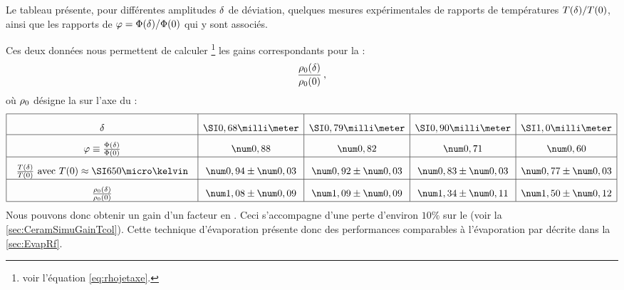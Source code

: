 \noindent Le tableau  présente, pour différentes amplitudes ${\delta}$ de déviation, quelques mesures expérimentales de rapports de températures 
$
{{T({\delta})} / {T(0)}}
$,
ainsi que les rapports de \fats
$
{\varphi}={{{\Phi}({\delta})} / {{\Phi}(0)}}
$
qui y sont associés. 

\noindent Ces deux données nous permettent de calculer%
\footnote{voir l'équation \vref{eq:rhojetaxe}.}
les gains correspondants pour la \ddedpup :
\[
\frac{{\rho_{0}}({\delta})}{{\rho_{0}}(0)}
\, ,
\]
où ${\rho_{0}}$ désigne la \ddedpup sur l'axe du \jat:
\[
\setlength{\extrarowheight}{9 pt}\label{tab:CeramDDEDPUP}
\begin{array}{|c|c|c|c|c|}
\hline
   \Devi & 
   \mm{0,68} & \mm{0,79} & \mm{0,90} & \mm{1,0} \\
\hline
   \rapflux\equiv\frac{\flux(\Devi)}{\flux(0)} & 
   \val{0,88} & \val{0,82} & \val{0,71} & \val{0,60} \\
\hline
   \,\,\, \frac{T(\Devi)}{T(0)} \mbox{ avec } T(0)\approx\microK{650} \,\,\, & 
   \val{0,94}\pm\val{0,03} & \val{0,92}\pm\val{0,03} & \val{0,83}\pm\val{0,03} & \val{0,77}\pm\val{0,03} \\
\hline
   \frac{\rhojetaxe(\Devi)}{\rhojetaxe(0)} & 
   \val{1,08}\pm\val{0,09} & \val{1,09}\pm\val{0,09} & \val{1,34}\pm\val{0,11} & \val{1,50}\pm\val{0,12} \\
\hline
\end{array}
\]
\Resultat
{
Nous pouvons donc obtenir un gain d'un facteur  en \ddedpup. Ceci s'accompagne d'une perte d'environ $10\%$ sur le \tcolel (voir la \autoref{sec:CeramSimuGainTcol}). Cette technique d'évaporation présente donc des performances comparables à l'évaporation par \firf décrite dans la \autoref{sec:EvapRf}.
}



